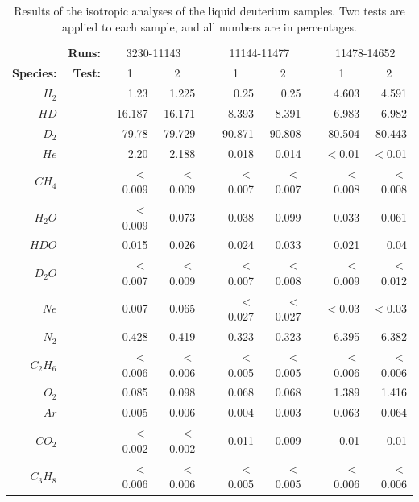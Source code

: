 \begin{table}
	\centering
	\begin{tabular}{@{}rrrrrrrrrr@{}}
		\toprule
		{} & \textbf{Runs:} & \multicolumn{2}{c}{3230-11143} & \phantom{abc} & \multicolumn{2}{c}{11144-11477} & \phantom{abc} & \multicolumn{2}{c}{11478-14652} \\ \cmidrule{3-4} \cmidrule{6-7} \cmidrule{9-10}
		\textbf{Species:} & \textbf{Test:} & \multicolumn{1}{c}{1} & \multicolumn{1}{c}{2} & & \multicolumn{1}{c}{1} & \multicolumn{1}{c}{2} & & \multicolumn{1}{c}{1} & \multicolumn{1}{c}{2} \\ \midrule
		$H_2$	& & 1.23 & 1.225 					& & 0.25 & 0.25 				& & 4.603 & 4.591 \\
		$HD$		  & & 16.187 & 16.171 						& & 8.393 & 8.391 			   & & 6.983 & 6.982 \\
		$D_2$ 	& & 79.78 & 79.729 			 	  & & 90.871 & 90.808 			& & 80.504 & 80.443 \\
		$He$ 		   & & 2.20 & 2.188 		 		 	   & & 0.018 & 0.014 				& & $<$0.01 & $<$0.01 \\
		$CH_4$ & & $<$0.009 & $<$0.009 	   & & $<$0.007 & $<$0.007 	 & & $<$0.008 & $<$0.008 \\
		$H_2O$ 	& & $<$0.009 & 0.073   			& & 0.038 & 0.099 			   & & 0.033 & 0.061 \\
		$HDO$ 	 & & 0.015 & 0.026 					& & 0.024 & 0.033 				& & 0.021 & 0.04 \\
		$D_2O$ & & $<$0.007 & $<$0.009      & & $<$0.007 & $<$0.008   & & $<$0.009 & $<$0.012 \\
		$Ne$ 		   & & 0.007 & 0.065 		   		  & & $<$0.027 & $<$0.027 	& & $<$0.03 & $<$0.03 \\
		$N_2$ 	& & 0.428 & 0.419 				    & & 0.323 & 0.323 			   & & 6.395 & 6.382 \\
		$C_2H_6$ & & $<$0.006 & $<$0.006   & & $<$0.005 & $<$0.005   & & $<$0.006 & $<$0.006 \\
		$O_2$ 	& & 0.085 & 0.098 			 	  		   & & 0.068 & 0.068 			   & & 1.389 & 1.416 \\
		$Ar$ 			& & 0.005 & 0.006 				 		  & & 0.004 & 0.003 			  & & 0.063 & 0.064 \\
		$CO_2$ & & $<$0.002 & $<$0.002	    & & 0.011 & 0.009 				 & & 0.01 & 0.01 \\
		$C_3H_8$ & & $<$0.006 & $<$0.006  & & $<$0.005 & $<$0.005   & & $<$0.006 & $<$0.006 \\
		\bottomrule
	\end{tabular}
	\caption{Results of the isotropic analyses of the liquid deuterium samples. Two tests are applied to each sample, and all numbers are in percentages.}
	\label{tab:deut-contam}
\end{table}


